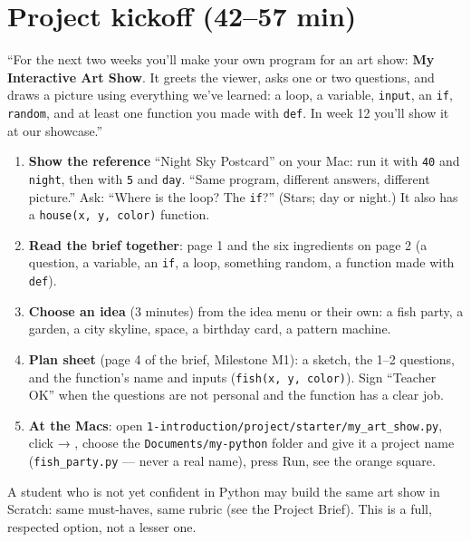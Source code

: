 \section{Project kickoff (42--57 min)}
\begin{teacherscript}
\enquote{For the next two weeks you'll make your own program for an art show: \textbf{My Interactive Art Show}. It greets the viewer, asks one or two questions, and draws a picture using everything we've learned: a loop, a variable, \texttt{input}, an \texttt{if}, \texttt{random}, and at least one function you made with \texttt{def}. In week 12 you'll show it at our showcase.}
\end{teacherscript}
\begin{enumerate}[leftmargin=1.4em,itemsep=2pt]
  \item \textbf{Show the reference} \enquote{Night Sky Postcard} on your Mac: run it with \texttt{40} and \texttt{night}, then with \texttt{5} and \texttt{day}. \enquote{Same program, different answers, different picture.} Ask: \enquote{Where is the loop? The \texttt{if}?} (Stars; day or night.) It also has a \texttt{house(x, y, color)} function.
  \item \textbf{Read the brief together}: page 1 and the six ingredients on page 2 (a question, a variable, an \texttt{if}, a loop, something random, a function made with \texttt{def}).
  \item \textbf{Choose an idea} (3 minutes) from the idea menu or their own: a fish party, a garden, a city skyline, space, a birthday card, a pattern machine.
  \item \textbf{Plan sheet} (page 4 of the brief, Milestone M1): a sketch, the 1--2 questions, and the function's name and inputs (\texttt{fish(x, y, color)}). Sign \enquote{Teacher OK} when the questions are not personal and the function has a clear job.
  \item \textbf{At the Macs}: open \texttt{1-introduction/project/starter/my\_art\_show.py}, click  → , choose the \texttt{Documents/my-python} folder and give it a project name (\texttt{fish\_party.py} --- never a real name), press Run, see the orange square.
\end{enumerate}
\begin{teachernote}
A student who is not yet confident in Python may build the same art show in Scratch: same must-haves, same rubric (see the Project Brief). This is a full, respected option, not a lesser one.
\end{teachernote}

